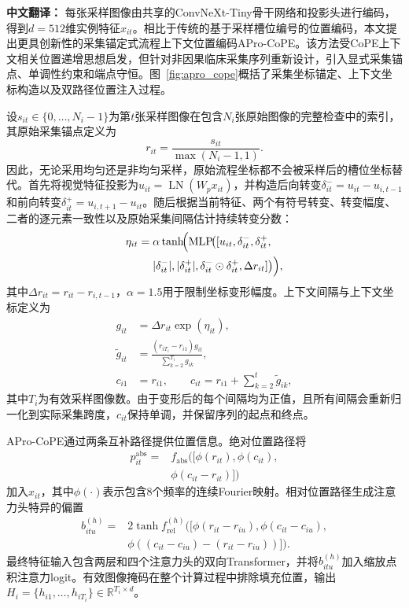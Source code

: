 \documentclass[Afour,sagev,times]{sagej}
\begin{document}
\textbf{中文翻译：} 每张采样图像由共享的ConvNeXt-Tiny骨干网络和投影头进行编码，得到$d=512$维实例特征$x_{it}$。相比于传统的基于采样槽位编号的位置编码，本文提出更具创新性的采集锚定式流程上下文位置编码APro-CoPE。该方法受CoPE上下文相关位置递增思想启发，但针对非因果临床采集序列重新设计，引入显式采集锚点、单调性约束和端点守恒。图~\ref{fig:apro_cope}概括了采集坐标锚定、上下文坐标构造以及双路径位置注入过程。

设$s_{it}\in\{0,\ldots,N_i-1\}$为第$t$张采样图像在包含$N_i$张原始图像的完整检查中的索引，其原始采集锚点定义为
\begin{equation}
r_{it}=\frac{s_{it}}{\max(N_i-1,1)}.
\end{equation}
因此，无论采用均匀还是非均匀采样，原始流程坐标都不会被采样后的槽位坐标替代。首先将视觉特征投影为$u_{it}=\operatorname{LN}(W_px_{it})$，并构造后向转变$\delta^-_{it}=u_{it}-u_{i,t-1}$和前向转变$\delta^+_{it}=u_{i,t+1}-u_{it}$。随后根据当前特征、两个有符号转变、转变幅度、二者的逐元素一致性以及原始采集间隔估计持续转变分数：
\begin{equation}
\begin{aligned}
\eta_{it}={}&\alpha\tanh\!\Bigl(\operatorname{MLP}\!\bigl(
[u_{it},\delta^-_{it},\delta^+_{it},\\
&|\delta^-_{it}|,|\delta^+_{it}|,
\delta^-_{it}\odot\delta^+_{it},\Delta r_{it}]\bigr)\Bigr),
\end{aligned}
\end{equation}
其中$\Delta r_{it}=r_{it}-r_{i,t-1}$，$\alpha=1.5$用于限制坐标变形幅度。上下文间隔与上下文坐标定义为
\begin{align}
g_{it}&=\Delta r_{it}\exp(\eta_{it}),\\
\widetilde g_{it}&=\frac{(r_{iT_i}-r_{i1})g_{it}}{\sum_{k=2}^{T_i}g_{ik}},\\
c_{i1}&=r_{i1},\qquad c_{it}=r_{i1}+\sum_{k=2}^{t}\widetilde g_{ik},
\end{align}
其中$T_i$为有效采样图像数。由于变形后的每个间隔均为正值，且所有间隔会重新归一化到实际采集跨度，$c_{it}$保持单调，并保留序列的起点和终点。

APro-CoPE通过两条互补路径提供位置信息。绝对位置路径将
\begin{equation}
\begin{aligned}
p^{\mathrm{abs}}_{it}={}&f_{\mathrm{abs}}([\phi(r_{it}),\phi(c_{it}),\\
&\phi(c_{it}-r_{it})])
\end{aligned}
\end{equation}
加入$x_{it}$，其中$\phi(\cdot)$表示包含8个频率的连续Fourier映射。相对位置路径生成注意力头特异的偏置
\begin{equation}
\begin{aligned}
b^{(h)}_{itu}={}&2\tanh f^{(h)}_{\mathrm{rel}}\bigl([\phi(r_{it}-r_{iu}),
\phi(c_{it}-c_{iu}),\\
&\phi((c_{it}-c_{iu})-(r_{it}-r_{iu}))]\bigr).
\end{aligned}
\end{equation}
最终特征输入包含两层和四个注意力头的双向Transformer，并将$b^{(h)}_{itu}$加入缩放点积注意力logit。有效图像掩码在整个计算过程中排除填充位置，输出$H_i=\{h_{i1},\ldots,h_{iT_i}\}\in\mathbb{R}^{T_i\times d}$。
\end{document}
